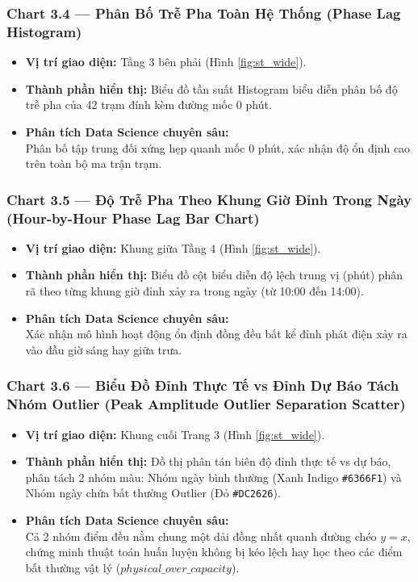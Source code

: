 \documentclass[12pt,a4paper]{article}
\begin{document}
\subsubsection{Chart 3.4 — Phân Bố Trễ Pha Toàn Hệ Thống (Phase Lag Histogram)}
\begin{itemize}
    \item \textbf{Vị trí giao diện:} Tầng 3 bên phải (Hình \ref{fig:st_wide}).
    \item \textbf{Thành phần hiển thị:} Biểu đồ tần suất Histogram biểu diễn phân bố độ trễ pha của 42 trạm đính kèm đường mốc 0 phút.
    \item \textbf{Phân tích Data Science chuyên sâu:}\\ 
    Phân bố tập trung đối xứng hẹp quanh mốc 0 phút, xác nhận độ ổn định cao trên toàn bộ ma trận trạm.
\end{itemize}

\subsubsection{Chart 3.5 — Độ Trễ Pha Theo Khung Giờ Đỉnh Trong Ngày (Hour-by-Hour Phase Lag Bar Chart)}
\begin{itemize}
    \item \textbf{Vị trí giao diện:} Khung giữa Tầng 4 (Hình \ref{fig:st_wide}).
    \item \textbf{Thành phần hiển thị:} Biểu đồ cột biểu diễn độ lệch trung vị (phút) phân rã theo từng khung giờ đỉnh xảy ra trong ngày (từ 10:00 đến 14:00).
    \item \textbf{Phân tích Data Science chuyên sâu:}\\ 
    Xác nhận mô hình hoạt động ổn định đồng đều bất kể đỉnh phát điện xảy ra vào đầu giờ sáng hay giữa trưa.
\end{itemize}

\subsubsection{Chart 3.6 — Biểu Đồ Đỉnh Thực Tế vs Đỉnh Dự Báo Tách Nhóm Outlier (Peak Amplitude Outlier Separation Scatter)}
\begin{itemize}
    \item \textbf{Vị trí giao diện:} Khung cuối Trang 3 (Hình \ref{fig:st_wide}).
    \item \textbf{Thành phần hiển thị:} Đồ thị phân tán biên độ đỉnh thực tế vs dự báo, phân tách 2 nhóm màu: Nhóm ngày bình thường (Xanh Indigo \texttt{\#6366F1}) và Nhóm ngày chứa bất thường Outlier (Đỏ \texttt{\#DC2626}).
    \item \textbf{Phân tích Data Science chuyên sâu:}\\ 
    Cả 2 nhóm điểm đều nằm chung một dải đồng nhất quanh đường chéo $y=x$, chứng minh thuật toán huấn luyện không bị kéo lệch hay học theo các điểm bất thường vật lý ($physical\_over\_capacity$).
\end{itemize}
\end{document}
